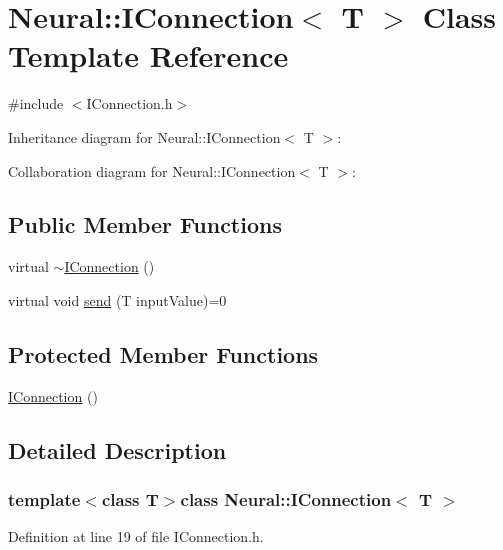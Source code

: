 \hypertarget{class_neural_1_1_i_connection}{
\section{Neural::IConnection$<$ T $>$ Class Template Reference}
\label{class_neural_1_1_i_connection}
}


{\ttfamily \#include $<$IConnection.h$>$}



Inheritance diagram for Neural::IConnection$<$ T $>$:


Collaboration diagram for Neural::IConnection$<$ T $>$:
\subsection*{Public Member Functions}
\begin{DoxyCompactItemize}
\item 
virtual \hyperlink{class_neural_1_1_i_connection_aea42aee87642c96d5fdcdfa3a4c127d3}{$\sim$IConnection} ()
\item 
virtual void \hyperlink{class_neural_1_1_i_connection_a23bae1760ff52eb93192b7b665d83599}{send} (T inputValue)=0
\end{DoxyCompactItemize}
\subsection*{Protected Member Functions}
\begin{DoxyCompactItemize}
\item 
\hyperlink{class_neural_1_1_i_connection_ad1b6de04209f2c88369b9df4662fb5a9}{IConnection} ()
\end{DoxyCompactItemize}


\subsection{Detailed Description}
\subsubsection*{template$<$class T$>$class Neural::IConnection$<$ T $>$}



Definition at line 19 of file IConnection.h.



